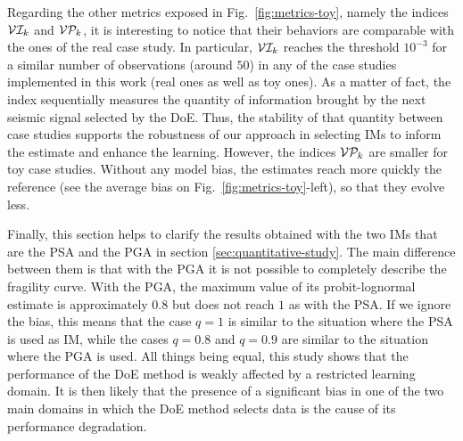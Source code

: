     Regarding the other metrics exposed in Fig.~\ref{fig:metrics-toy}, namely the indices $\mathcal{V}\mathcal{I}_k$ and $\mathcal{V}\mathcal{P}_k$, it is interesting to notice that their behaviors are comparable with the ones of the real case study. In particular, $\mathcal{V}\mathcal{I}_k$ reaches the threshold $10^{-3}$ for a similar number of observations (around $50$) in any of the case studies implemented in this work (real ones as well as toy ones).
    As a matter of fact, the index sequentially measures the quantity of information brought by the next seismic signal selected by the DoE. Thus, the stability of that quantity between case studies supports the robustness of our approach in selecting IMs to inform the estimate and enhance the learning.
    However, the indices $\mathcal{V}\mathcal{P}_k$ are smaller for toy case studies. Without any model bias, the estimates reach more quickly the reference (see the average bias on Fig.~\ref{fig:metrics-toy}-left), so that they evolve less.
    
    
    {Finally, this section helps to clarify the results obtained with the two IMs that are the PSA and the PGA in section \ref{sec:quantitative-study}. The main difference between them is that with the PGA it is not possible to completely describe the fragility curve. With the PGA, the maximum value of its probit-lognormal estimate is approximately $0.8$ but does not reach $1$ as with the PSA. If we ignore the bias, this means that the case $q=1$ is similar to the situation where the PSA is used as IM, while the cases  $q=0.8$ and $q=0.9$ are similar to the situation where the PGA is used. All things being equal, this study shows that the performance of the DoE method is weakly affected by a restricted learning domain. It is then likely that the presence of a significant bias in one of the two main domains in which the DoE method selects data is the cause of its performance degradation.}
    
